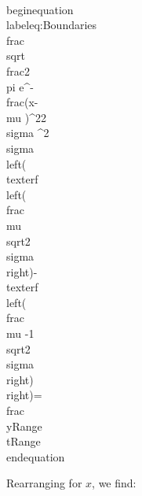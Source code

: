 \\begin{equation}\\label{eq:Boundaries}
\\frac{\\sqrt{\\frac{2}{\\pi }} e^{-\\frac{(x-\\mu )^2}{2 \\sigma ^2}}}{\\sigma  \\left(\\text{erf}\\left(\\frac{\\mu }{\\sqrt{2} \\sigma }\\right)-\\text{erf}\\left(\\frac{\\mu -1}{\\sqrt{2} \\sigma }\\right)\\right)}=\\frac{\\yRange}{\\tRange}
\\end{equation}

Rearranging for $x$, we find:

